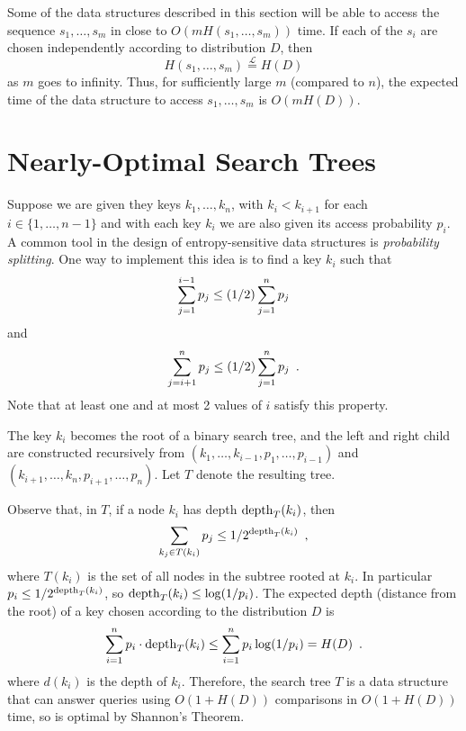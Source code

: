 Some of the data structures described in this section will be able to
access the sequence $s_1,\ldots,s_m$ in close to $O(mH(s_1,\ldots,s_m))$
time.  If each of the $s_i$ are chosen independently according to
distribution $D$, then
\[
   H(s_1,\ldots,s_m) \stackrel{\mathcal{L}}{=} H(D)
\]
as $m$ goes to infinity.  Thus, for sufficiently large $m$ (compared
to $n$), the expected time of the data structure to access
$s_1,\ldots,s_m$ is $O(mH(D))$.

\section{Nearly-Optimal Search Trees}

Suppose we are given they keys $k_1,\ldots,k_n$, with $k_i<k_{i+1}$
for each $i\in\{1,\ldots,n-1\}$ and with each key $k_i$ we are also
given its access probability $p_i$.  A common tool in the design of
entropy-sensitive data structures is \emph{probability splitting}.
One way to implement this idea is to find a key $k_i$ such that
\begin{equation}
  \sum_{j=1}^{i-1} p_j \le (1/2) \sum_{j=1}^{n} p_j
    \eqlabel{split-left}
\end{equation}
and
\begin{equation}
  \sum_{j=i+1}^{n} p_j \le (1/2) \sum_{j=1}^{n} p_j\enspace .
    \eqlabel{split-right}
\end{equation}
Note that at least one and at most 2 values of $i$ satisfy this property.

The key $k_i$ becomes the root of a binary search tree, and the left and
right child are constructed recursively from
$(k_1,\ldots,k_{i-1},p_1,\ldots,p_{i-1})$ and
$(k_{i+1},\ldots,k_n,p_{i+1},\ldots,p_n)$.  Let $T$ denote the resulting tree.

Observe that, in $T$, if a node $k_i$ has depth $\mathrm{depth}_T(k_i)$, then
\[
   \sum_{k_j\in T(k_i)} p_j \le 1/2^{\mathrm{depth}_T(k_i)} \enspace ,
\]
where $T(k_i)$ is the set of all nodes in the subtree rooted at $k_i$.
In particular $p_i \le 1/2^{\mathrm{depth}_T(k_i)}$, so $\mathrm{depth}_T(k_i) \le \log(1/p_i)$.
The expected depth (distance from the root) of a key chosen according to the distribution $D$ is 
\[
   \sum_{i=1}^n p_{i}\cdot\mathrm{depth}_T(k_i) \le \sum_{i=1}^n p_{i} \log(1/p_i) = H(D) \enspace .
\]
where $d(k_i)$ is the depth of $k_i$.  Therefore, the search tree $T$
is a data structure that can answer queries using $O(1+H(D))$ comparisons
in $O(1+H(D))$ time, so is optimal by Shannon's Theorem.

